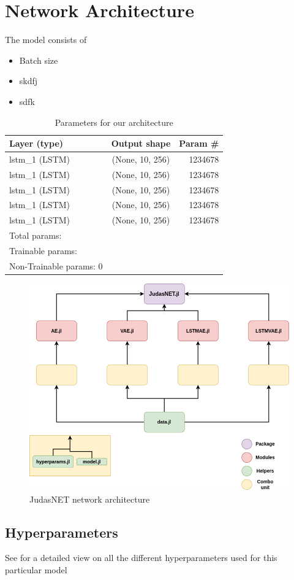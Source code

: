 \section{Network Architecture}

The model consists of

\begin{itemize}
    \item Batch size 
    \item skdfj
    \item sdfk
\end{itemize}

\begin{table}[h]
    \centering
    \begin{tabular}{ l c r }
      \hline
      Layer (type) & Output shape & Param \# \\ \hline
      lstm\_1 (LSTM) & (None, 10, 256) & 1234678 \\ \hline
      lstm\_1 (LSTM) & (None, 10, 256) & 1234678 \\ \hline
      lstm\_1 (LSTM) & (None, 10, 256) & 1234678 \\ \hline
      lstm\_1 (LSTM) & (None, 10, 256) & 1234678 \\ \hline
      lstm\_1 (LSTM) & (None, 10, 256) & 1234678 \\ \hline
      Total params: & & \\
      Trainable params: & & \\ 
      Non-Trainable params: 0 & & \\ \hline
      
    \end{tabular}
    \caption{Parameters for our architecture}
    \label{tab:archparams}
\end{table}


\begin{figure}[h]
    \centering
    \includegraphics{figures/judasnet.png}
    \caption{JudasNET network architecture}
    \label{fig:judasnet}
\end{figure}


\subsection{Hyperparameters}

See \cite{app:hyperparams} for a detailed view on all the different hyperparameters used for this particular model

